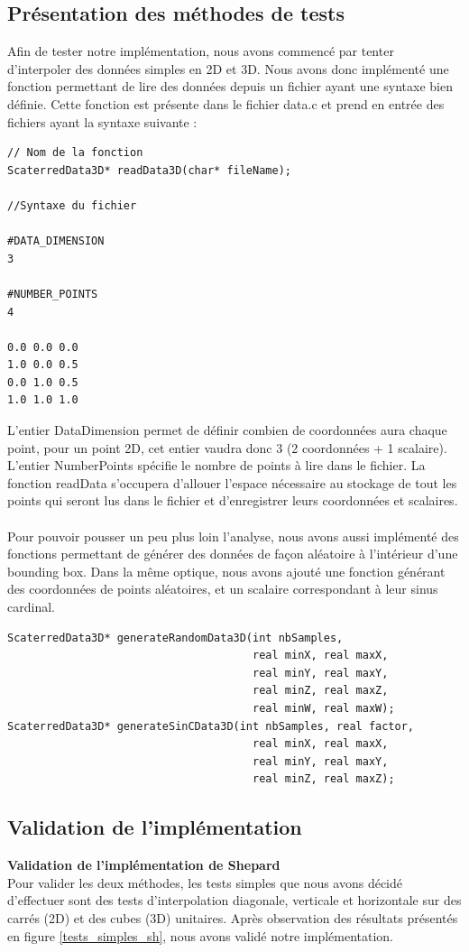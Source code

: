 \documentclass[a4paper,9pt]{article}
\begin{document}
\subsection{Présentation des méthodes de tests}
\label{subsec:presentation_tests}
Afin de tester notre implémentation, nous avons commencé par tenter d'interpoler des données simples en 2D et 3D. Nous avons donc implémenté une fonction permettant de lire des données depuis un fichier ayant une syntaxe bien définie. Cette fonction est présente dans le fichier data.c et prend en entrée des fichiers ayant la syntaxe suivante :
\begin{verbatim}
// Nom de la fonction
ScaterredData3D* readData3D(char* fileName);

//Syntaxe du fichier

#DATA_DIMENSION
3

#NUMBER_POINTS
4

0.0 0.0 0.0
1.0 0.0 0.5
0.0 1.0 0.5
1.0 1.0 1.0
\end{verbatim}
L'entier DataDimension permet de définir combien de coordonnées aura chaque point, pour un point 2D, cet entier vaudra donc 3 (2 coordonnées + 1 scalaire). L'entier NumberPoints spécifie le nombre de points à lire dans le fichier. La fonction readData s'occupera d'allouer l'espace nécessaire au stockage de tout les points qui seront lus dans le fichier et d'enregistrer leurs coordonnées et scalaires.\\\\
Pour pouvoir pousser un peu plus loin l'analyse, nous avons aussi implémenté des fonctions permettant de générer des données de façon aléatoire à l'intérieur d'une bounding box. Dans la même optique, nous avons ajouté une fonction générant des coordonnées de points aléatoires, et un scalaire correspondant à leur sinus cardinal.
\begin{verbatim}
ScaterredData3D* generateRandomData3D(int nbSamples,
                                      real minX, real maxX,
                                      real minY, real maxY,
                                      real minZ, real maxZ,
                                      real minW, real maxW);
ScaterredData3D* generateSinCData3D(int nbSamples, real factor,
                                      real minX, real maxX,
                                      real minY, real maxY,
                                      real minZ, real maxZ);
\end{verbatim} 

\subsection{Validation de l'implémentation}
\label{subsec:validation_implementation}
\textbf{Validation de l'implémentation de Shepard}\\
Pour valider les deux méthodes, les tests simples que nous avons décidé d'effectuer sont des tests d'interpolation diagonale, verticale et horizontale sur des carrés (2D) et des cubes (3D) unitaires. Après observation des résultats présentés en figure \ref{tests_simples_sh}, nous avons validé notre implémentation.
\end{document}
